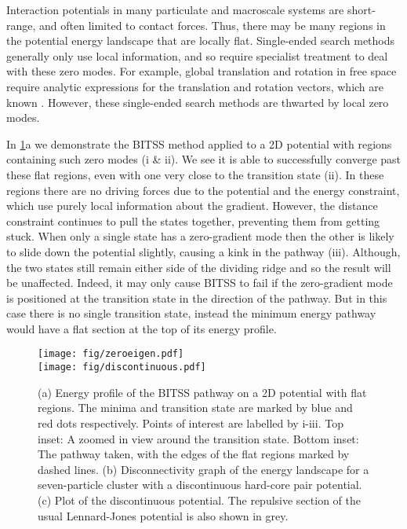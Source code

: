 \documentclass[aps,prl,twocolumn,groupedaddress]{revtex4}
\newcommand{\temp}[1]{{\leavevmode\color{red}#1}}
\begin{document}
\topic Interaction potentials in many particulate and macroscale systems are short-range, and often limited to contact forces.
Thus, there may be many regions in the potential energy landscape that are locally flat.
Single-ended search methods generally only use local information, and so require specialist treatment to deal with these zero modes.
For example, global translation and rotation in free space require analytic expressions for the translation and rotation vectors, which are known \temp{\cite{Wales2004}}.
However, these single-ended search methods are thwarted by local zero modes.

\topic In \cref{fig:flatdiscontinuous}a we demonstrate the BITSS method applied to a 2D potential with regions containing such zero modes (i \& ii).
We see it is able to successfully converge past these flat regions, even with one very close to the transition state (ii).
In these regions there are no driving forces due to the potential and the energy constraint, which use purely local information about the gradient.
However, the distance constraint continues to pull the states together, preventing them from getting stuck.
When only a single state has a zero-gradient mode then the other is likely to slide down the potential slightly, causing a kink in the pathway (iii).
Although, the two states still remain either side of the dividing ridge and so the result will be unaffected.
Indeed, it may only cause BITSS to fail if the zero-gradient mode is positioned at the transition state in the direction of the pathway.
But in this case there is no single transition state, instead the minimum energy pathway would have a flat section at the top of its energy profile.

\begin{figure}[tb]
  \texttt{[image: fig/zeroeigen.pdf]}\\
  \texttt{[image: fig/discontinuous.pdf]}
  \caption{\label{fig:flatdiscontinuous}
    (a) Energy profile of the BITSS pathway on a 2D potential with flat regions.
        The minima and transition state are marked by blue and red dots respectively.
        Points of interest are labelled by i-iii.
        Top inset: A zoomed in view around the transition state.
        Bottom inset: The pathway taken, with the edges of the flat regions marked by dashed lines.
    (b) Disconnectivity graph of the energy landscape for a seven-particle cluster with a discontinuous hard-core pair potential.
    (c) Plot of the discontinuous potential.
        The repulsive section of the usual Lennard-Jones potential is also shown in grey.
  }
\end{figure}
\end{document}
